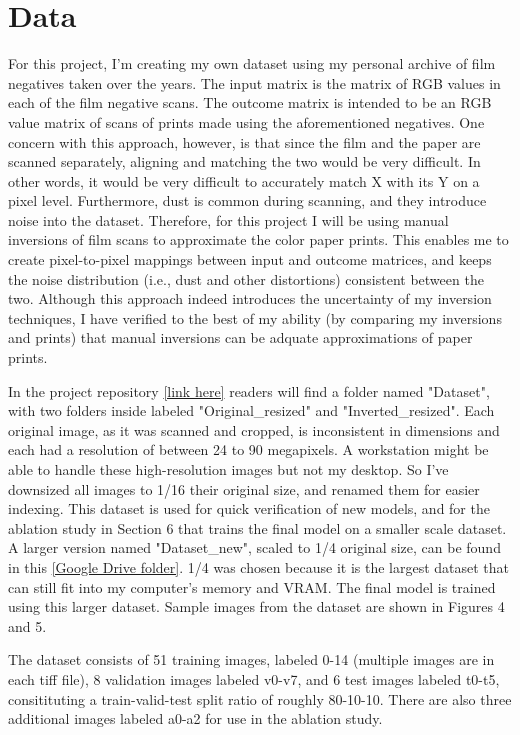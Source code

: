 \documentclass[twoside,11pt]{article}
\begin{document}
\section{Data}
\label{sec:data}
For this project, I'm creating my own dataset using my personal archive of film negatives taken over the years.
The input matrix is the matrix of RGB values in each of the film negative scans. The outcome matrix is intended to be an RGB value matrix 
of scans of prints made using the aforementioned negatives. One concern with this approach, however, is that since the film and the paper are scanned separately, 
aligning and matching the two would be very difficult. In other words, it would be very difficult to accurately match X with its Y on a pixel level. 
Furthermore, dust is common during scanning, and they introduce noise into the dataset. Therefore, for this project I will be using manual inversions of film scans to 
approximate the color paper prints. This enables me to create pixel-to-pixel mappings between input and outcome matrices, and keeps the noise distribution 
(i.e., dust and other distortions) consistent between the two. Although this approach indeed introduces the uncertainty of my inversion techniques, I have verified to the 
best of my ability (by comparing my inversions and prints) that manual inversions can be adquate approximations of paper prints.

In the project repository \href{https://github.com/kg9903/CS374Project}{[link here]} readers will find a folder named "Dataset", with two folders inside labeled "Original\_resized" and "Inverted\_resized". 
Each original image, as it was scanned and cropped, is inconsistent in dimensions and each had a resolution of between 24 to 90 megapixels. 
A workstation might be able to handle these high-resolution images but not my desktop. So I've downsized all images to 1/16 their original size, 
and renamed them for easier indexing. This dataset is used for quick verification of new models, and for the ablation study in Section 6 that trains the final model on a smaller scale dataset.
A larger version named "Dataset\_new", scaled to 1/4 original size, can be found in this \href{https://drive.google.com/drive/folders/1XUgtn5v4YuRLZEz4H8YvbSK9jIvOFv1y?usp=sharing}{[Google Drive folder]}. 
1/4 was chosen because it is the largest dataset that can still fit into my computer's memory and VRAM. The final model is trained using this larger dataset. Sample images from the dataset are shown in Figures 4 and 5.

The dataset consists of 51 training images, labeled 0-14 (multiple images are in each tiff file), 8 validation images labeled v0-v7, and 6 test images labeled t0-t5, 
consitituting a train-valid-test split ratio of roughly 80-10-10. There are also three additional images labeled a0-a2 for use in the ablation study.
\end{document}
